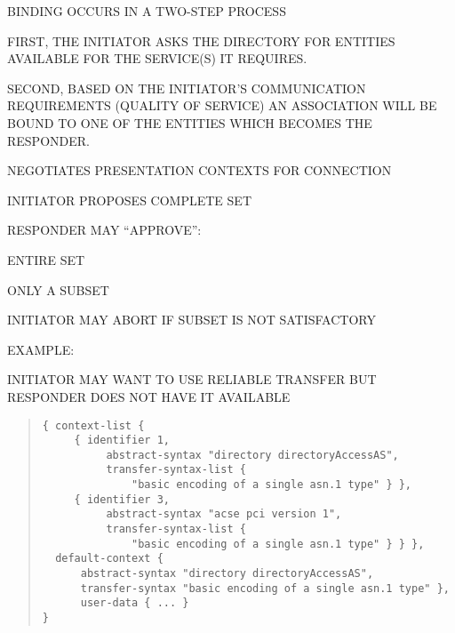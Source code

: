 \begin{bwslide}

\begin{nrtc}
\item	BINDING OCCURS IN A TWO-STEP PROCESS
\item	FIRST, THE INITIATOR ASKS THE DIRECTORY FOR ENTITIES AVAILABLE
	FOR THE SERVICE(S) IT REQUIRES.
\item	SECOND, BASED ON THE INITIATOR'S COMMUNICATION REQUIREMENTS (QUALITY
	OF SERVICE) AN ASSOCIATION WILL BE BOUND TO ONE OF THE ENTITIES 
	WHICH BECOMES THE RESPONDER.
\end{nrtc}
\end{bwslide}


\begin{bwslide}

\begin{nrtc}
\item	NEGOTIATES PRESENTATION CONTEXTS FOR CONNECTION
	\begin{nrtc}
	\item	INITIATOR PROPOSES COMPLETE SET
	\item	RESPONDER MAY ``APPROVE'':
		\begin{nrtc}
		\item	ENTIRE SET
		\item	ONLY A SUBSET
		\end{nrtc}
	\item	INITIATOR MAY ABORT IF SUBSET IS NOT SATISFACTORY
	\end{nrtc}
\item	EXAMPLE:
	\begin{nrtc}
	\item	INITIATOR MAY WANT TO USE RELIABLE TRANSFER BUT 
		RESPONDER DOES NOT HAVE IT AVAILABLE
	\end{nrtc}
\end{nrtc}
\end{bwslide}




\begin{bwslide}

\begin{quote}\small\begin{verbatim}
{ context-list {
     { identifier 1,
          abstract-syntax "directory directoryAccessAS",
          transfer-syntax-list {
              "basic encoding of a single asn.1 type" } },
     { identifier 3,
          abstract-syntax "acse pci version 1",
          transfer-syntax-list {
              "basic encoding of a single asn.1 type" } } },
  default-context {
      abstract-syntax "directory directoryAccessAS",
      transfer-syntax "basic encoding of a single asn.1 type" },
      user-data { ... }
}
\end{verbatim}\end{quote}
\end{bwslide}


